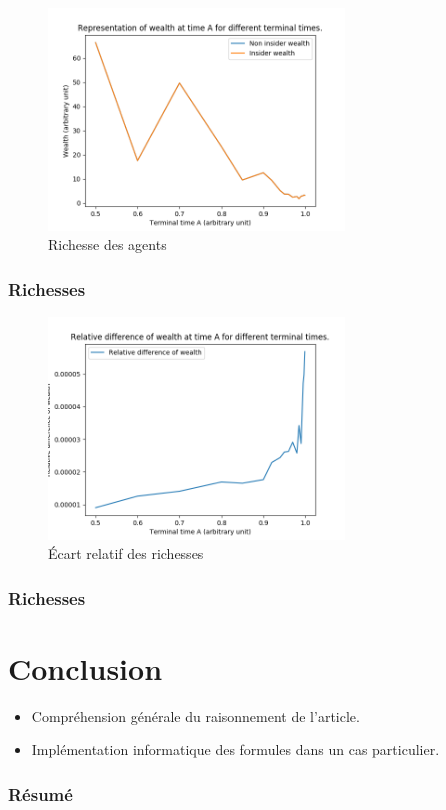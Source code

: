 \documentclass[french]{beamer}
\begin{document}
\begin{frame}
\begin{figure}[H]
  \centering
    \includegraphics[width=0.7\textwidth]{images/wealths.png}
  \caption{Richesse des agents}
\end{figure} 
\frametitle{Richesses}
\end{frame}

\begin{frame}
\begin{figure}[H]
  \centering
    \includegraphics[width=0.7\textwidth]{images/relative_difference.png}
  \caption{Écart relatif des richesses}
\end{figure} 
\frametitle{Richesses}
\end{frame}

\section{Conclusion}
\begin{frame}
\begin{itemize}
	\item Compréhension générale du raisonnement de l'article.
	\item Implémentation informatique des formules dans un cas particulier.
\end{itemize}
\frametitle{Résumé}
\end{frame}
\end{document}
